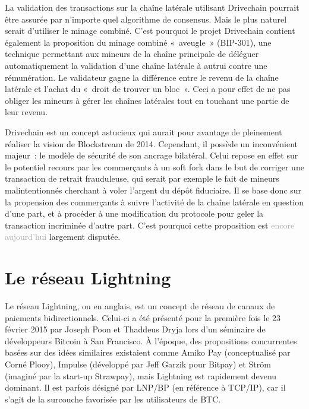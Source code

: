 La validation des transactions sur la chaîne latérale utilisant Drivechain pourrait être assurée par n'importe quel algorithme de consensus. Mais le plus naturel serait d'utiliser le minage combiné. C'est pourquoi le projet Drivechain contient également la proposition du minage combiné «~aveugle~» (BIP-301), une technique permettant aux mineurs de la chaîne principale de déléguer automatiquement la validation d'une chaîne latérale à autrui contre une rémunération. Le validateur gagne la différence entre le revenu de la chaîne latérale et l'achat du «~droit de trouver un bloc~». Ceci a pour effet de ne pas obliger les mineurs à gérer les chaînes latérales tout en touchant une partie de leur revenu. %

Drivechain est un concept astucieux qui aurait pour avantage de pleinement réaliser la vision de Blockstream de 2014. Cependant, il possède un inconvénient majeur~: le modèle de sécurité de son ancrage bilatéral. Celui repose en effet sur le potentiel recours par les commerçants à un soft fork dans le but de corriger une transaction de retrait frauduleuse, qui serait par exemple le fait de mineurs malintentionnés cherchant à voler l'argent du dépôt fiduciaire. Il se base donc sur la propension des commerçants à suivre l'activité de la chaîne latérale en question d'une part, et à procéder à une modification du protocole pour geler la transaction incriminée d'autre part. C'est pourquoi cette proposition est \textcolor{darkgray}{encore aujourd'hui} largement disputée.

\section*{Le réseau Lightning}


Le réseau Lightning, ou  en anglais, est un concept de réseau de canaux de paiements bidirectionnels. Celui-ci a été présenté pour la première fois le 23 février 2015 par Joseph Poon et Thaddeus Dryja lors d'un séminaire de développeurs Bitcoin à San Francisco. À l'époque, des propositions concurrentes basées sur des idées similaires existaient comme Amiko Pay (conceptualisé par Corné Plooy), Impulse (développé par Jeff Garzik pour Bitpay) et Ström (imaginé par la start-up Strawpay), mais Lightning est rapidement devenu dominant. Il est parfois désigné par LNP/BP (en référence à TCP/IP), car il s'agit de la surcouche favorisée par les utilisateurs de BTC.

